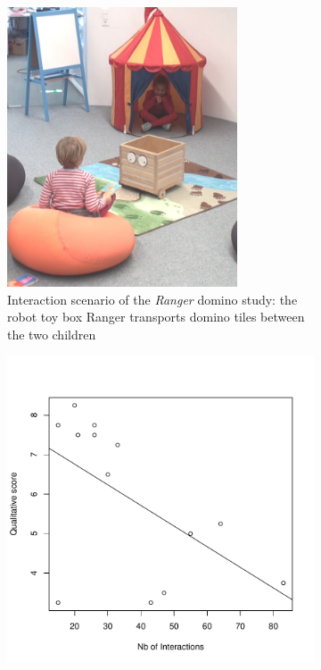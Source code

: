 \documentclass{frontiersSCNS} %
\begin{document}
\begin{figure}[h!]
        \centering
        \begin{subfigure}[b]{0.48\columnwidth}
                \centering
                \includegraphics[width=0.75\textwidth]{ranger}
                \caption{Interaction scenario of the \emph{Ranger} domino study: the robot toy box Ranger transports domino tiles between the two children}
                \label{fig:ranger-expe}
        \end{subfigure}%
        \hspace{0.5cm}
        \begin{subfigure}[b]{0.48\columnwidth}
            \includegraphics[width=\textwidth]{ranger-interactions-vs-qualitative-score}

\end{subfigure}
\end{figure}
\end{document}
